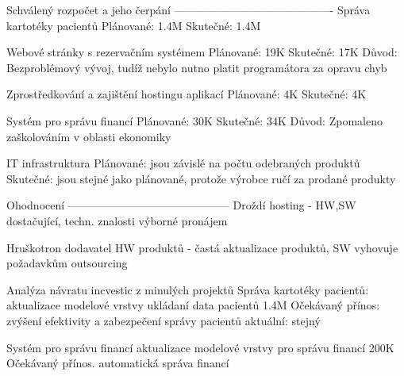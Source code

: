 \documentclass[11pt, a4paper, titlepage]{article}
\begin{document}
		Schválený rozpočet a jeho čerpání
		-------------------------------------------
		Správa kartotéky pacientů
			Plánované: 1.4M
			Skutečné: 1.4M

		Webové stránky s rezervačním systémem
			Plánované: 19K
			Skutečné: 17K
			Důvod: Bezproblémový vývoj, tudíž nebylo nutno platit programátora za opravu chyb

		Zprostředkování a zajištění hostingu aplikací
			Plánované: 4K
			Skutečné: 4K


		Systém pro správu financí
			Plánované: 30K
			Skutečné: 34K
			Důvod: Zpomaleno zaškolováním v oblasti ekonomiky

		IT infrastruktura
			Plánované: jsou závislé na počtu odebraných produktů
			Skutečné: jsou stejné jako plánované, protože výrobce ručí za prodané produkty

		Ohodnocení
		--------------------------------------------
		Droždí
			hosting - HW,SW dostačující, techn. znalosti výborné
			pronájem

		Hruškotron
			dodavatel HW produktů - častá aktualizace produktů, SW vyhovuje požadavkům
			outsourcing

		Analýza návratu incvestic z minulých projektů
			Správa kartotéky pacientů:
				aktualizace modelové vrstvy ukládaní data pacientů
				1.4M
				Očekávaný přínos: zvýšení efektivity a zabezpečení správy pacientů
				aktuální: stejný
		
			Systém pro správu financí
				aktualizace modelové vrstvy pro správu financí
				200K
				Očekávaný přínos. automatická správa financí
\end{document}
